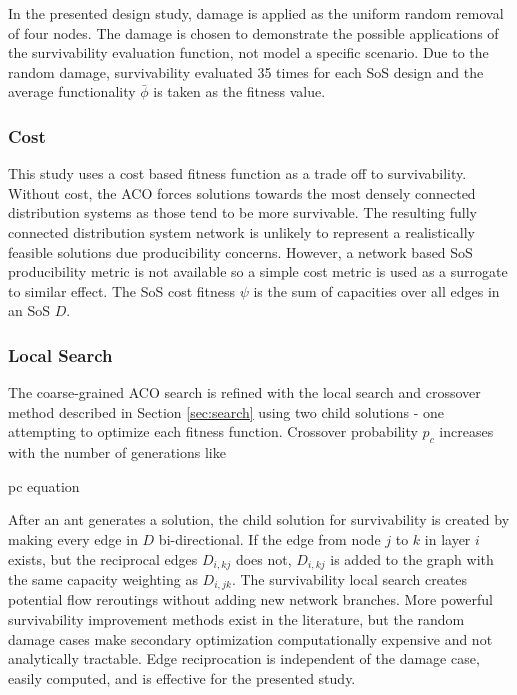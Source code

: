 \documentclass[preprint,12pt]{elsarticle}
\begin{document}
In the presented design study, damage is applied as the uniform random removal of four nodes. The damage is chosen to demonstrate the possible applications of the survivability evaluation function, not model a specific scenario. Due to the random damage, survivability evaluated 35 times for each SoS design and the average functionality $\bar{\phi}$ is taken as the fitness value.


\subsubsection{Cost}

This study uses a cost based fitness function as a trade off to survivability. Without cost, the ACO forces solutions towards the most densely connected distribution systems as those tend to be more survivable. The resulting fully connected distribution system network is unlikely to represent a realistically feasible solutions due producibility concerns. However, a network based SoS producibility metric is not available so a simple cost metric is used as a surrogate to similar effect. The SoS cost fitness $\psi$ is the sum of capacities over all edges in an SoS $D$.



\subsubsection{Local Search}

The coarse-grained ACO search is refined with the local search and crossover method described in Section \ref{sec:search} using two child solutions - one attempting to optimize each fitness function. Crossover probability $p_c$ increases with the number of generations like

pc equation

After an ant generates a solution, the child solution for survivability is created by making every edge in $D$ bi-directional. If the edge from node $j$ to $k$ in layer $i$ exists, but the reciprocal edges $D_{i,kj}$ does not, $D_{i,kj}$ is added to the graph with the same capacity weighting as $D_{i,jk}$. The survivability local search creates potential flow reroutings without adding new network branches. More powerful survivability improvement methods exist in the literature, but the random damage cases make secondary optimization computationally expensive and not analytically tractable. Edge reciprocation is independent of the damage case, easily computed, and is effective for the presented study. 
\end{document}
